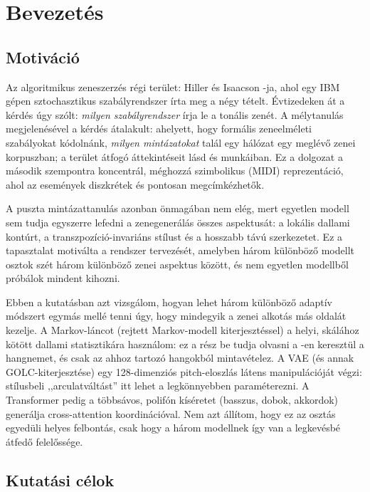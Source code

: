 
\chapter{Bevezetés}


\section{Motiváció}

Az algoritmikus zeneszerzés régi terület: Hiller és Isaacson \cite{hiller1958musical}-ja, ahol egy IBM gépen sztochasztikus szabályrendszer írta meg a négy tételt. Évtizedeken át a kérdés úgy szólt: \emph{milyen szabályrendszer} írja le a tonális zenét. A mélytanulás megjelenésével a kérdés átalakult: ahelyett, hogy formális zeneelméleti szabályokat kódolnánk, \emph{milyen mintázatokat} talál egy hálózat egy meglévő zenei korpuszban; a terület átfogó áttekintéseit lásd \cite{DBLP:journals/corr/abs-1709-01620} és \cite{ji2023comprehensive} munkáiban. Ez a dolgozat a második szempontra koncentrál, méghozzá szimbolikus (MIDI) reprezentáció, ahol az események diszkrétek és pontosan megcímkézhetők.

A puszta mintázattanulás azonban önmagában nem elég, mert egyetlen modell sem tudja egyszerre lefedni a zenegenerálás összes aspektusát: a lokális dallami kontúrt, a transzpozíció-invariáns stílust és a hosszabb távú szerkezetet. Ez a tapasztalat motiválta a rendszer tervezését, amelyben három különböző modellt osztok szét három különböző zenei aspektus között, és nem egyetlen modellből próbálok mindent kihozni.

Ebben a kutatásban azt vizsgálom, hogyan lehet három különböző adaptív módszert egymás mellé tenni úgy, hogy mindegyik a zenei alkotás más oldalát kezelje. A Markov-láncot (rejtett Markov-modell kiterjesztéssel) a helyi, skálához kötött dallami statisztikára használom: ez a rész be tudja olvasni a \cite{CuthbertAriza2010}-en keresztül a hangnemet, és csak az ahhoz tartozó hangokból mintavételez. A VAE (és annak GOLC-kiterjesztése) egy 128-dimenziós pitch-eloszlás látens manipulációját végzi: stílusbeli ,,arculatváltást'' itt lehet a legkönnyebben paraméterezni. A Transformer pedig a többsávos, polifón kíséretet (basszus, dobok, akkordok) generálja cross-attention koordinációval. Nem azt állítom, hogy ez az osztás egyedüli helyes felbontás, csak hogy a három modellnek így van a legkevésbé átfedő felelőssége.

\section{Kutatási célok}

